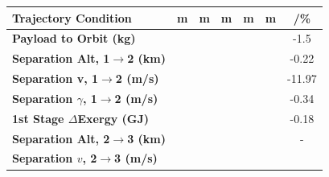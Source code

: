 \begin{table}[ht]
	\centering
	
	
\begin{tabular}{l c c c c c c} 
	\hline \textbf{Trajectory Condition}
	&m
	&m
	&m
	&m
	&m
	& /\%
	\\
	\hline \textbf{Payload to Orbit (kg)}
	& \PayloadToOrbitmSPARTANNinetyFiveNoReturn
	& \PayloadToOrbitmSPARTANNinetySevenFiveNoReturn
	& \PayloadToOrbitmSPARTANStandardNoReturn
	& \PayloadToOrbitmSPARTANOneHundredTwoFiveNoReturn
	& \PayloadToOrbitmSPARTANOneHundredFiveNoReturn
	&-1.5
	\\
	\textbf{Separation Alt, 1$\rightarrow$2 (km)}
	& \firstsecondSeparationAltmSPARTANNinetyFiveNoReturn
	& \firstsecondSeparationAltmSPARTANNinetySevenFiveNoReturn
	& \firstsecondSeparationAltmSPARTANStandardNoReturn
	& \firstsecondSeparationAltmSPARTANOneHundredTwoFiveNoReturn
	& \firstsecondSeparationAltmSPARTANOneHundredFiveNoReturn
	&-0.22
	\\
	\textbf{Separation v, 1$\rightarrow$2 (m/s)}
	& \firstsecondSeparationvmSPARTANNinetyFiveNoReturn
	& \firstsecondSeparationvmSPARTANNinetySevenFiveNoReturn
	& \firstsecondSeparationvmSPARTANStandardNoReturn
	& \firstsecondSeparationvmSPARTANOneHundredTwoFiveNoReturn
	& \firstsecondSeparationvmSPARTANOneHundredFiveNoReturn
	&-11.97
	\\
	\textbf{Separation $\gamma$, 1$\rightarrow$2 (m/s)}
	& \firstsecondSeparationgammamSPARTANNinetyFiveNoReturn
	& \firstsecondSeparationgammamSPARTANNinetySevenFiveNoReturn
	& \firstsecondSeparationgammamSPARTANStandardNoReturn
	& \firstsecondSeparationgammamSPARTANOneHundredTwoFiveNoReturn
	& \firstsecondSeparationgammamSPARTANOneHundredFiveNoReturn
	&-0.34
	\\
	\textbf{1st Stage $\Delta$Exergy (GJ)}
	& \firstdExergymSPARTANNinetyFiveNoReturn
	& \firstdExergymSPARTANNinetySevenFiveNoReturn
	& \firstdExergymSPARTANStandardNoReturn
	& \firstdExergymSPARTANOneHundredTwoFiveNoReturn
	& \firstdExergymSPARTANOneHundredFiveNoReturn
	&-0.18
	\\
	\textbf{Separation Alt, 2$\rightarrow$3 (km)}
	& \secondthirdSeparationAltmSPARTANNinetyFiveNoReturn
	& \secondthirdSeparationAltmSPARTANNinetySevenFiveNoReturn
	& \secondthirdSeparationAltmSPARTANStandardNoReturn
	& \secondthirdSeparationAltmSPARTANOneHundredTwoFiveNoReturn
	& \secondthirdSeparationAltmSPARTANOneHundredFiveNoReturn
	& -
	\\
	\textbf{Separation $v$, 2$\rightarrow$3 (m/s)}
	& \secondthirdSeparationvmSPARTANNinetyFiveNoReturn

\end{tabular}
\end{table}
